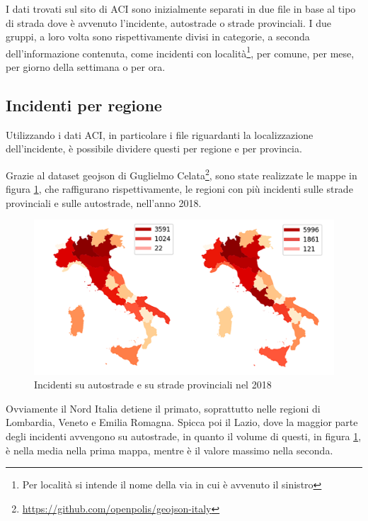 \documentclass[a4paper,12pt]{report}
\begin{document}
I dati trovati sul sito di ACI sono inizialmente separati in due file in 
base al tipo di strada dove è avvenuto l'incidente, autostrade o strade provinciali.
I due gruppi, a loro volta sono rispettivamente divisi in categorie, a seconda 
dell'informazione contenuta, come incidenti con 
località\footnote{Per località si intende il nome della via in cui è avvenuto il sinistro}, 
per comune, per mese, per giorno della settimana o per ora.

\subsection{Incidenti per regione}

Utilizzando i dati ACI, in particolare i file riguardanti la 
localizzazione dell'incidente, è 
possibile dividere questi per regione e per provincia.

Grazie al dataset geojson di Guglielmo 
Celata\footnote{\url{https://github.com/openpolis/geojson-italy}}, 
sono state realizzate le mappe in figura \ref{fig:incidenti-per-regione}, 
che raffigurano rispettivamente, le regioni con più incidenti 
sulle strade provinciali e sulle autostrade, nell'anno 2018.

\begin{figure}
    \includegraphics[width=\linewidth]{img_unite/incidenti_autostrade_provinciali.png}
    \caption{Incidenti su autostrade e su strade provinciali nel 2018}
    \label{fig:incidenti-per-regione}
\end{figure}

Ovviamente il Nord Italia detiene il primato, 
soprattutto nelle regioni di Lombardia, Veneto e Emilia Romagna. 
Spicca poi il Lazio, dove la maggior parte degli incidenti avvengono su autostrade, 
in quanto il volume di questi, in figura \ref{fig:incidenti-per-regione}, 
è nella media nella prima mappa, mentre è il valore massimo nella seconda.
\end{document}
